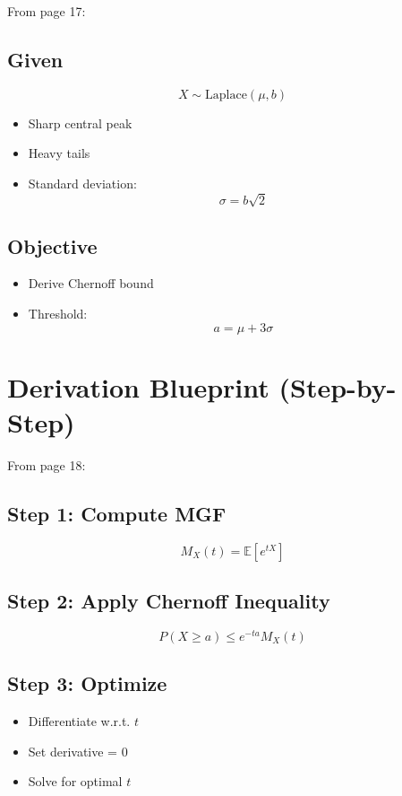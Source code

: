 \documentclass[11pt]{article}
\begin{document}
From page 17:

\subsection{Given}

\[
X \sim \text{Laplace}(\mu, b)
\]

\begin{itemize}
\item Sharp central peak
\item Heavy tails
\item Standard deviation:
\[
\sigma = b\sqrt{2}
\]
\end{itemize}

\subsection{Objective}

\begin{itemize}
\item Derive Chernoff bound
\item Threshold:
\[
a = \mu + 3\sigma
\]
\end{itemize}

\section{Derivation Blueprint (Step-by-Step)}

From page 18:

\subsection{Step 1: Compute MGF}

\[
M_X(t) = \mathbb{E}[e^{tX}]
\]

\subsection{Step 2: Apply Chernoff Inequality}

\[
P(X \ge a) \le e^{-ta} M_X(t)
\]

\subsection{Step 3: Optimize}

\begin{itemize}
\item Differentiate w.r.t. $t$
\item Set derivative = 0
\item Solve for optimal $t$
\end{itemize}
\end{document}
